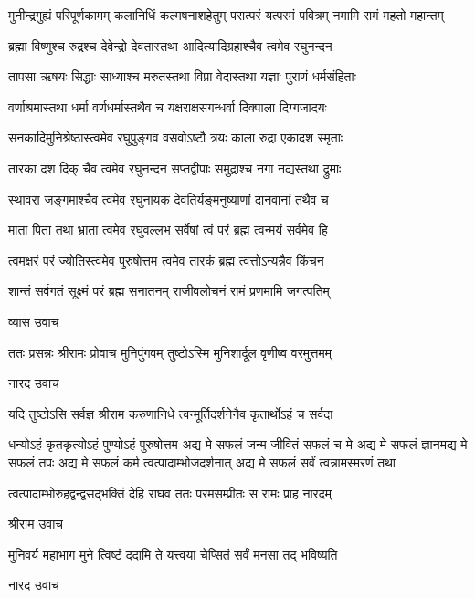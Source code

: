 \fourlineindentedshloka
{मुनीन्द्रगुह्यं परिपूर्णकामम्} 
{कलानिधिं कल्मषनाशहेतुम्}
{परात्परं यत्परमं पवित्रम्}
{नमामि रामं महतो महान्तम्}%

\twolineshloka
{ब्रह्मा विष्णुश्च रुद्रश्च देवेन्द्रो देवतास्तथा}
{आदित्यादिग्रहाश्चैव त्वमेव रघुनन्दन}%

\twolineshloka
{तापसा ऋषयः सिद्धाः साध्याश्च मरुतस्तथा}
{विप्रा वेदास्तथा यज्ञाः पुराणं धर्मसंहिताः}%

\twolineshloka
{वर्णाश्रमास्तथा धर्मा वर्णधर्मास्तथैव च}
{यक्षराक्षसगन्धर्वा दिक्पाला दिग्गजादयः}%

\twolineshloka
{सनकादिमुनिश्रेष्ठास्त्वमेव रघुपुङ्गव}
{वसवोऽष्टौ त्रयः काला रुद्रा एकादश स्मृताः}%

\twolineshloka
{तारका दश दिक् चैव त्वमेव रघुनन्दन}
{सप्तद्वीपाः समुद्राश्च नगा नद्यस्तथा द्रुमाः}%

\twolineshloka
{स्थावरा जङ्गमाश्चैव त्वमेव रघुनायक}
{देवतिर्यङ्मनुष्याणां दानवानां तथैव च}%

\twolineshloka
{माता पिता तथा भ्राता त्वमेव रघुवल्लभ}
{सर्वेषां त्वं परं ब्रह्म त्वन्मयं सर्वमेव हि}%

\twolineshloka
{त्वमक्षरं परं ज्योतिस्त्वमेव पुरुषोत्तम}
{त्वमेव तारकं ब्रह्म त्वत्तोऽन्यन्नैव किंचन}%

\twolineshloka
{शान्तं सर्वगतं सूक्ष्मं परं ब्रह्म सनातनम्}
{राजीवलोचनं रामं प्रणमामि जगत्पतिम्}%

व्यास उवाच

\twolineshloka
{ततः प्रसन्नः श्रीरामः प्रोवाच मुनिपुंगवम्}
{तुष्टोऽस्मि मुनिशार्दूल वृणीष्व वरमुत्तमम्}%

नारद उवाच

\twolineshloka
{यदि तुष्टोऽसि सर्वज्ञ श्रीराम करुणानिधे}
{त्वन्मूर्तिदर्शनेनैव कृतार्थोऽहं च सर्वदा}%

\threelineshloka
{धन्योऽहं कृतकृत्योऽहं पुण्योऽहं पुरुषोत्तम}
{अद्य मे सफलं जन्म जीवितं सफलं च मे}%
{अद्य मे सफलं ज्ञानमद्य मे सफलं तपः}
\twolineshloka
{अद्य मे सफलं कर्म त्वत्पादाम्भोजदर्शनात्}
{अद्य मे सफलं सर्वं त्वन्नामस्मरणं तथा}%

\twolineshloka
{त्वत्पादाम्भोरुहद्वन्द्वसद्भक्तिं देहि राघव}
{ततः परमसम्प्रीतः स रामः प्राह नारदम्}%

श्रीराम उवाच

\twolineshloka
{मुनिवर्य महाभाग मुने त्विष्टं ददामि ते}
{यत्त्वया चेप्सितं सर्वं मनसा तद् भविष्यति}%

नारद उवाच

